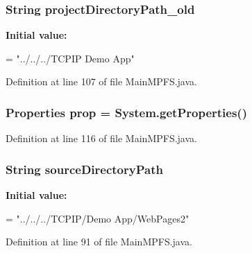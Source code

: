 \subsubsection[{project\+Directory\+Path\+\_\+old}]{\setlength{\rightskip}{0pt plus 5cm}String project\+Directory\+Path\+\_\+old}\label{class_microchip_m_p_f_s_1_1_main_m_p_f_s_a22845bce6cdfbd7f97f33b0e5582fb05}
{\bfseries Initial value\+:}
\begin{DoxyCode}
=
            \textcolor{stringliteral}{"../../../TCPIP Demo App"}
\end{DoxyCode}


Definition at line 107 of file Main\+M\+P\+F\+S.\+java.

\hypertarget{class_microchip_m_p_f_s_1_1_main_m_p_f_s_af00ddb1b1d61f3b675e6be958411b324}{}
\subsubsection[{prop}]{\setlength{\rightskip}{0pt plus 5cm}Properties prop = System.\+get\+Properties()}\label{class_microchip_m_p_f_s_1_1_main_m_p_f_s_af00ddb1b1d61f3b675e6be958411b324}


Definition at line 116 of file Main\+M\+P\+F\+S.\+java.

\hypertarget{class_microchip_m_p_f_s_1_1_main_m_p_f_s_abb6486032a587fb2d71ed7c59cf3d723}{}
\subsubsection[{source\+Directory\+Path}]{\setlength{\rightskip}{0pt plus 5cm}String source\+Directory\+Path}\label{class_microchip_m_p_f_s_1_1_main_m_p_f_s_abb6486032a587fb2d71ed7c59cf3d723}
{\bfseries Initial value\+:}
\begin{DoxyCode}
=
            \textcolor{stringliteral}{"../../../TCPIP/Demo App/WebPages2"}
\end{DoxyCode}


Definition at line 91 of file Main\+M\+P\+F\+S.\+java.

